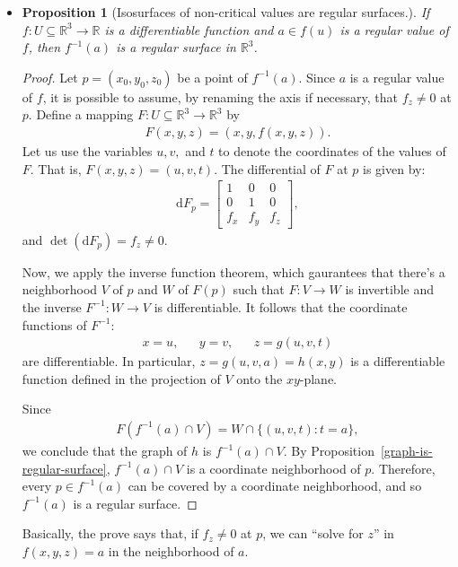 \documentclass[10pt]{article}
\newtheorem{proposition}[lemma]{Proposition}
\newcommand{\dee}{\mathrm{d}}
\newcommand{\ra}{\rightarrow}
\newcommand{\Real}{\mathbb{R}}
\newcommand{\sseq}{\subseteq}
\begin{document}
\begin{itemize}
    \item \begin{proposition}[Isosurfaces of non-critical values are regular surfaces.] \label{isosurface-is-regular}
          If $f : U \sseq \Real^3 \ra \Real$ is a differentiable function and $a \in f(u)$ is a regular value of $f$, then $f^{-1}(a)$ is a regular surface in $\Real^3$.
    \end{proposition}
    \begin{proof}
      Let $p = (x_0, y_0, z_0)$ be a point of $f^{-1}(a)$. Since $a$ is a regular value of $f$, it is possible to assume, by renaming the axis if necessary, that $f_z \neq 0$ at $p$. Define a mapping $F: U \sseq \Real^3 \ra \Real^3$ by
      \begin{align*}
        F(x,y,z) = (x, y, f(x,y,z)).
      \end{align*}
      Let us use the variables $u, v, $ and $t$ to denote the coordinates of the values of $F$. That is, $F(x,y,z) = (u,v,t).$ The differential of $F$ at $p$ is given by:
      \begin{align*}
        \dee F_p =
        \begin{bmatrix}
          1 & 0 & 0\\
          0 & 1 & 0\\
          f_x & f_y & f_z
        \end{bmatrix},
      \end{align*}
      and $\det(\dee F_p) = f_z \neq 0$.

      Now, we apply the inverse function theorem, which gaurantees that there's a neighborhood $V$ of $p$ and $W$ of $F(p)$ such that $F: V \ra W$ is invertible and the inverse $F^{-1}: W \ra V$ is differentiable. It follows that the coordinate functions of $F^{-1}$:
      \begin{align*}
        x = u, & & y = v, & & z = g(u,v,t)
      \end{align*}
      are differentiable. In particular, $z = g(u,v,a) = h(x,y)$ is a differentiable function defined in the projection of $V$ onto the $xy$-plane.

      Since
      \begin{align*}
        F(f^{-1}(a) \cap V) = W \cap \{(u,v,t) : t = a \},
      \end{align*}
      we conclude that the graph of $h$ is $f^{-1}(a) \cap V$. By Proposition~\ref{graph-is-regular-surface}, $f^{-1}(a) \cap V$ is a coordinate neighborhood of $p$. Therefore, every $p \in f^{-1}(a)$ can be covered by a coordinate neighborhood, and so $f^{-1}(a)$ is a regular surface.
    \end{proof}

    Basically, the prove says that, if $f_z \neq 0$ at $p$, we can ``solve for $z$'' in $f(x,y,z) = a$ in the neighborhood of $a$. 
  \end{itemize}
\end{document}
